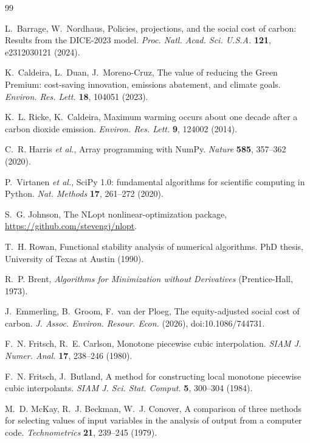 \documentclass[11pt]{article}
\begin{document}
\begin{thebibliography}{99}

L.~Barrage, W.~Nordhaus, Policies, projections, and the social cost of carbon:
Results from the DICE-2023 model. \emph{Proc. Natl. Acad. Sci. U.S.A.}
\textbf{121}, e2312030121 (2024).

K.~Caldeira, L.~Duan, J.~Moreno-Cruz, The value of reducing the Green Premium:
cost-saving innovation, emissions abatement, and climate goals.
\emph{Environ. Res. Lett.} \textbf{18}, 104051 (2023).

K.~L. Ricke, K.~Caldeira, Maximum warming occurs about one decade after a
carbon dioxide emission. \emph{Environ. Res. Lett.} \textbf{9}, 124002 (2014).

C.~R. Harris \emph{et al.}, Array programming with NumPy. \emph{Nature}
\textbf{585}, 357--362 (2020).

P.~Virtanen \emph{et al.}, SciPy 1.0: fundamental algorithms for scientific
computing in Python. \emph{Nat. Methods} \textbf{17}, 261--272 (2020).

S.~G. Johnson, The NLopt nonlinear-optimization package,
\url{https://github.com/stevengj/nlopt}.

T.~H. Rowan, Functional stability analysis of numerical algorithms. PhD thesis,
University of Texas at Austin (1990).

R.~P. Brent, \emph{Algorithms for Minimization without Derivatives}
(Prentice-Hall, 1973).

J.~Emmerling, B.~Groom, F.~van der Ploeg, The equity-adjusted social cost of
carbon. \emph{J. Assoc. Environ. Resour. Econ.} (2026),
doi:10.1086/744731.

F.~N. Fritsch, R.~E. Carlson, Monotone piecewise cubic interpolation.
\emph{SIAM J. Numer. Anal.} \textbf{17}, 238--246 (1980).

F.~N. Fritsch, J.~Butland, A method for constructing local monotone piecewise
cubic interpolants. \emph{SIAM J. Sci. Stat. Comput.} \textbf{5}, 300--304
(1984).

M.~D. McKay, R.~J. Beckman, W.~J. Conover, A comparison of three methods for
selecting values of input variables in the analysis of output from a computer
code. \emph{Technometrics} \textbf{21}, 239--245 (1979).


\end{thebibliography}
\end{document}
